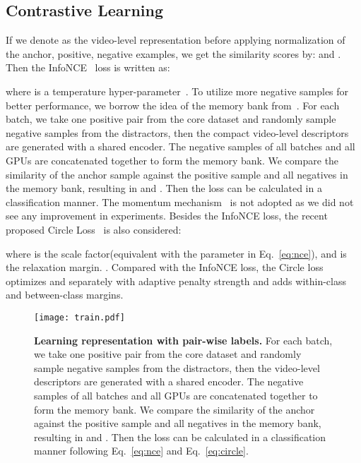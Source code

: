 \documentclass[10pt,twocolumn,letterpaper]{article}
\begin{document}
\subsection{Contrastive Learning} \label{subsection:contlearn}
If we denote  as the video-level representation before applying normalization of the anchor, positive, negative examples, we get the similarity scores by:  and . Then the InfoNCE~\cite{oord2018representation} loss is written as:
{\small

}
where  is a temperature hyper-parameter~\cite{wu2018unsupervised}. To utilize more negative samples for better performance, we borrow the idea of the memory bank from~\cite{wu2018unsupervised}. For each batch, we take one positive pair from the core dataset and randomly sample  negative samples from the distractors, then the compact video-level descriptors are generated with a shared encoder. The negative samples of all batches and all GPUs are concatenated together to form the memory bank. We compare the similarity of the anchor sample against the positive sample and all negatives in the memory bank, resulting in   and  . Then the loss can be calculated in a classification manner. The momentum mechanism~\cite{he2019momentum} is not adopted as we did not see any improvement in experiments. Besides the InfoNCE loss, the recent proposed Circle Loss~\cite{sun2020circle} is also considered:
{\small

}
where  is the scale factor(equivalent with the parameter  in Eq.~\ref{eq:nce}), and  is the relaxation margin. . Compared with the InfoNCE loss, the Circle loss optimizes  and  separately with adaptive penalty strength and adds within-class and between-class margins. 

\begin{figure}[t]
    \centering
    \texttt{[image: train.pdf]}
    \caption{\textbf{Learning representation with pair-wise labels.} For each batch, we take one positive pair from the core dataset and randomly sample  negative samples from the distractors, then the video-level descriptors are generated with a shared encoder. The negative samples of all batches and all GPUs are concatenated together to form the memory bank. We compare the similarity of the anchor against the positive sample and all negatives in the memory bank, resulting in   and  . Then the loss can be calculated in a classification manner following Eq.~\ref{eq:nce} and Eq.~\ref{eq:circle}.}
\label{fig:contrast}
\end{figure}
\end{document}
